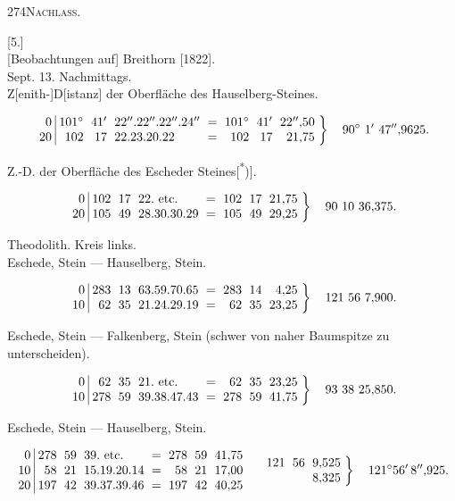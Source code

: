 \clearpage
\noindent{}274\hfill\textsc{Nachlass.}\hfill\mbox{}\par\medskip
\begin{center}
[5.]\\[3pt]
[Beobachtungen auf] Breithorn [1822].\\[4pt]
Sept. 13. Nachmittags.\\[4pt]
Z[enith-]D[istanz] der Oberfläche des Hauselberg-Steines.
\end{center}
\[
\setlength{\arraycolsep}{3pt}
\left.\begin{array}{r|rrlcrrr}
0&101^\circ&41'&22''.22''.22''.24''&=&101^\circ&41'&22''{,}50\\
20&102&17&22.23.20.22&=&102&17&21{,}75
\end{array}\right\}\quad90^\circ\ 1'\ 47''{,}9625.
\]
\begin{center}Z.-D. der Oberfläche des Escheder Steines[\textsuperscript{*})].\end{center}
\[
\setlength{\arraycolsep}{3pt}
\left.\begin{array}{r|rrlcrrr}
0&102&17&22.\ \text{etc.}&=&102&17&21{,}75\\
20&105&49&28.30.30.29&=&105&49&29{,}25
\end{array}\right\}\quad90\ 10\ 36{,}375.
\]
\begin{center}
Theodolith. Kreis links.\\[4pt]
Eschede, Stein --- Hauselberg, Stein.
\end{center}
\[
\setlength{\arraycolsep}{3pt}
\left.\begin{array}{r|rrlcrrr}
0&283&13&63.59.70.65&=&283&14&4{,}25\\
10&62&35&21.24.29.19&=&62&35&23{,}25
\end{array}\right\}\quad121\ 56\ 7{,}900.
\]
\begin{center}
Eschede, Stein --- Falkenberg, Stein (schwer von naher Baumspitze zu unterscheiden).
\end{center}
\[
\setlength{\arraycolsep}{3pt}
\left.\begin{array}{r|rrlcrrr}
0&62&35&21.\ \text{etc.}&=&62&35&23{,}25\\
10&278&59&39.38.47.43&=&278&59&41{,}75
\end{array}\right\}\quad93\ 38\ 25{,}850.
\]
\begin{center}Eschede, Stein --- Hauselberg, Stein.\end{center}
\[
\setlength{\arraycolsep}{3pt}
\begin{array}{r|rrlcrrr}
0&278&59&39.\ \text{etc.}&=&278&59&41{,}75\\
10&58&21&15.19.20.14&=&58&21&17{,}00\\
20&197&42&39.37.39.46&=&197&42&40{,}25
\end{array}
\quad
\left.\begin{array}{rrr}
121&56&9{,}525\\&&8{,}325
\end{array}\right\}\quad121^\circ56'\,8''{,}925.
\]
